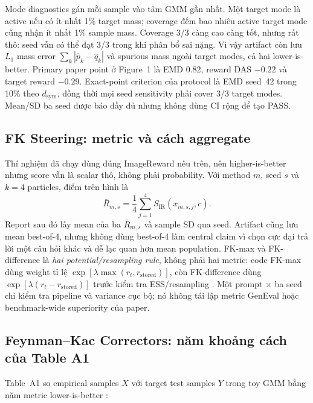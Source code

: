 \documentclass[11pt,a4paper]{article}
\begin{document}
Mode diagnostics gán mỗi sample vào tâm GMM gần nhất. Một target mode là active nếu có ít nhất 1\% target mass; coverage đếm bao nhiêu active target mode cũng nhận ít nhất 1\% sample mass. Coverage 3/3 càng cao càng tốt, nhưng rất thô: seed vẫn có thể đạt 3/3 trong khi phân bổ sai nặng. Vì vậy artifact còn lưu $L_1$ mass error $\sum_k|\hat p_k-\hat q_k|$ và spurious mass ngoài target modes, cả hai lower-is-better. Primary paper point ở Figure~1 là EMD 0.82, reward DAS $-0.22$ và target reward $-0.29$. Exact-point criterion của protocol là EMD seed~42 trong 10\% theo $d_{\mathrm{sym}}$, đồng thời mọi seed sensitivity phải cover 3/3 target modes. Mean/SD ba seed được báo đầy đủ nhưng không dùng CI rộng để tạo PASS.

\subsection{FK Steering: metric và cách aggregate}

Thí nghiệm đã chạy dùng đúng ImageReward nêu trên, nên higher-is-better nhưng score vẫn là scalar thô, không phải probability. Với method $m$, seed $s$ và $k=4$ particles, điểm trên hình là
\begin{equation}
  \bar R_{m,s}=\frac{1}{4}\sum_{j=1}^{4}S_{\mathrm{IR}}(x_{m,s,j},c).
\end{equation}
Report sau đó lấy mean của ba $\bar R_{m,s}$ và sample SD qua seed. Artifact cũng lưu mean best-of-4, nhưng không dùng best-of-4 làm central claim vì chọn cực đại trả lời một câu hỏi khác và dễ lạc quan hơn mean population. FK-max và FK-difference là \emph{hai potential/resampling rule}, không phải hai metric: code FK-max dùng weight tỉ lệ $\exp[\lambda\max(r_t,r_{\mathrm{stored}})]$, còn FK-difference dùng $\exp[\lambda(r_t-r_{\mathrm{stored}})]$ trước kiểm tra ESS/resampling \citep{Singhal2025FKSteering,FKSteeringCode}. Một prompt $\times$ ba seed chỉ kiểm tra pipeline và variance cục bộ; nó không tái lập metric GenEval hoặc benchmark-wide superiority của paper.

\subsection{Feynman--Kac Correctors: năm khoảng cách của Table A1}

Table~A1 so empirical samples $X$ với target test samples $Y$ trong toy GMM bằng năm metric lower-is-better \citep{Skreta2025FKC,FKCCode}:
\end{document}
